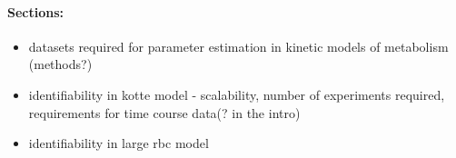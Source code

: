 \documentclass[10pt]{article}
\begin{document}
	\paragraph{Sections:}
	\begin{itemize}
		\item datasets required for parameter estimation in kinetic models of metabolism (methods?)		
		\item identifiability in kotte model - scalability, number of experiments required, requirements for time course data(? in the intro)		
		\item identifiability in large rbc model
	\end{itemize}
	
	\printbibliography
\end{document}
